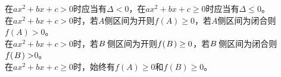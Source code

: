 \documentclass[UTF8]{ctexart}
\begin{document}
    在$ax^2+bx+c>0$时应当有$\Delta<0$，在$ax^2+bx+c\geq 0$时应当有$\Delta \leq 0$。\\[3mm]
    在$ax^2+bx+c>0$时，若$A$侧区间为开则$f(A)\geq 0$，若$A$侧区间为闭合则$f(A)>$0。\\[3mm]
    在$ax^2+bx+c>0$时，若$B\hspace{1.5pt}$侧区间为开则$f(\hspace{1.0pt}B\hspace{1.0pt})\geq 0$，若$B\hspace{1.5pt}$侧区间为闭合则$f(\hspace{1.0pt}B\hspace{1.0pt})>$0。\\[3mm]
    在$ax^2+bx+c\geq 0$时，始终有$f(A)\geq 0$和$f(B)\geq 0$。
    
\newpage
\end{document}
